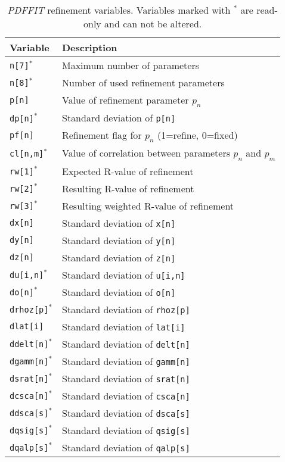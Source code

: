 \begin{table}[!htb]
\centering
\begin{tabularx}{\textwidth}{|p{30mm}|X|}
  \hline
  {\bf Variable} & {\bf Description} \\
  \hline \hline
  {\tt n[7]}$^{*}$    & Maximum number of parameters \\
  {\tt n[8]}$^{*}$    & Number of used refinement parameters \\
  \hline
  {\tt p[n]}          & Value of refinement parameter $p_{n}$ \\
  {\tt dp[n]}$^{*}$   & Standard deviation of {\tt p[n]} \\
  {\tt pf[n]}         & Refinement flag for $p_{n}$ (1=refine, 0=fixed) \\
  {\tt cl[n,m]}$^{*}$ & Value of correlation between parameters $p_{n}$ and
                        $p_{m}$ \\
  {\tt rw[1]}$^{*}$   & Expected R-value of refinement \\
  {\tt rw[2]}$^{*}$   & Resulting R-value of refinement \\
  {\tt rw[3]}$^{*}$   & Resulting weighted R-value of refinement \\
  \hline
  {\tt dx[n]}          & Standard deviation of {\tt x[n]} \\
  {\tt dy[n]}          & Standard deviation of {\tt y[n]} \\
  {\tt dz[n]}          & Standard deviation of {\tt z[n]} \\
  {\tt du[i,n]}$^{*}$  & Standard deviation of {\tt u[i,n]} \\
  {\tt do[n]}$^{*}$    & Standard deviation of {\tt o[n]} \\
  {\tt drhoz[p]}$^{*}$ & Standard deviation of {\tt rhoz[p]} \\
  {\tt dlat[i]}        & Standard deviation of {\tt lat[i]} \\
  {\tt ddelt[n]}$^{*}$ & Standard deviation of {\tt delt[n]} \\
  {\tt dgamm[n]}$^{*}$ & Standard deviation of {\tt gamm[n]} \\
  {\tt dsrat[n]}$^{*}$ & Standard deviation of {\tt srat[n]} \\
  {\tt dcsca[n]}$^{*}$ & Standard deviation of {\tt csca[n]} \\
  {\tt ddsca[s]}$^{*}$ & Standard deviation of {\tt dsca[s]} \\
  {\tt dqsig[s]}$^{*}$ & Standard deviation of {\tt qsig[s]} \\
  {\tt dqalp[s]}$^{*}$ & Standard deviation of {\tt qalp[s]} \\
  \hline
\end{tabularx}
\caption[{\it PDFFIT} refinement variables]
        {\label{v3-tab}{\it PDFFIT} refinement variables. Variables marked
         with $^{*}$ are read-only and can not be altered.}
\end{table}

